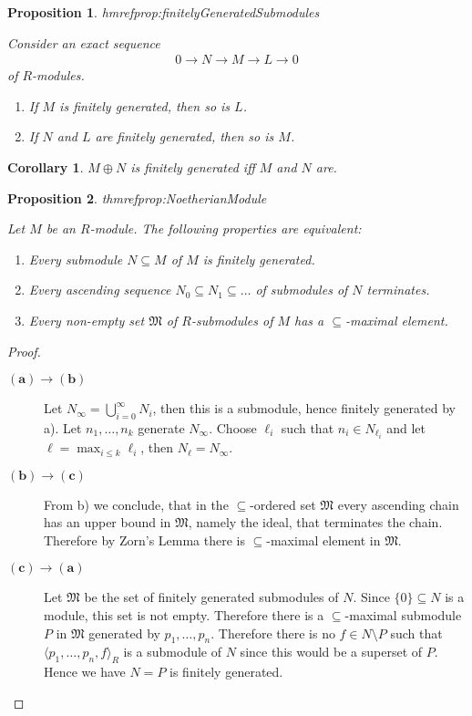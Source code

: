 \documentclass[DIV=14,parskip=full,pointednumbers]{scrartcl}
\newenvironment{alphanumerate}{\begin{enumerate}[label={\upshape(\alph*)}]}{\end{enumerate}}
\newenvironment{rmnumerate}{\begin{enumerate}[label={\upshape(\roman*)}]}{\end{enumerate}}
\theoremstyle{cthm}
\newtheorem{cor}{Corollary}[subsection]
\newtheorem{prop}{Proposition}[subsection]
\theoremstyle{cdef}
\newcommand{\lbl}[1]{
	\label{#1}
	\edef\dummy{\curthm}
	\expandafter\xdef\csname thmref#1\endcsname{\dummy}
}
\newcommand{\longto}{\longrightarrow}
\begin{document}
\begin{prop} \lbl{prop:finitelyGeneratedSubmodules}
 Consider an exact sequence
 \begin{align*}
 	0\longto N\longto M\longto L\longto 0
 \end{align*}
 of $R$-modules.
 \begin{rmnumerate}
  \item If $M$ is finitely generated, then so is $L$.
  \item If $N$ and $L$ are finitely generated, then so is $M$.
 \end{rmnumerate}
 \end{prop}
 
\begin{cor}
 $M\oplus N$ is finitely generated iff $M$ and $N$ are. 
\end{cor}
\begin{prop}\lbl{prop:NoetherianModule}
Let $M$ be an $R$-module. The following properties are equivalent:
\begin{alphanumerate}
 \item Every submodule $N\subseteq M$ of $M$ is finitely generated.
 \item Every ascending sequence $N_0\subseteq N_1\subseteq \ldots$ of submodules of $N$ terminates.
 \item Every non-empty set $\mathfrak{M}$ of $R$-submodules of $M$ has a $\subseteq$-maximal element.
\end{alphanumerate}
\end{prop}
\begin{proof}
\begin{description}
 \item [$\mathbf{(a)\to (b)}$] Let $N_\infty = \bigcup_{i=0}^\infty N_i$, then this is a submodule, hence finitely generated by a). Let $n_1,\ldots, n_k$ generate $N_\infty$. Choose $\ell_i$ such that $n_i\in N_{\ell_i}$ and let $\ell = \max_{i\leq k}\ell_i$, then $N_\ell = N_\infty$.
 \item [$\mathbf{(b)\to (c)}$] From b) we conclude, that in the $\subseteq$-ordered set $\mathfrak{M}$ every ascending chain has an upper bound in $\mathfrak{M}$, namely the ideal, that terminates the chain. Therefore by Zorn's Lemma there is $\subseteq$-maximal element in $\mathfrak{M}$.
 \item[$\mathbf{(c)\to (a)}$] Let $\mathfrak{M}$ be the set of finitely generated submodules of $N$. Since $\{0\}\subseteq N$ is a module, this set is not empty. Therefore there is a $\subseteq$-maximal submodule $P$ in $\mathfrak{M}$ generated by $p_1,\ldots, p_n$. Therefore there is no $f\in N\setminus P$ such that $\langle p_1,\ldots, p_n, f\rangle_R$ is a submodule of $N$ since this would be a superset of $P$. Hence we have $N=P$ is finitely generated.
\end{description}
\end{proof}
\end{document}
